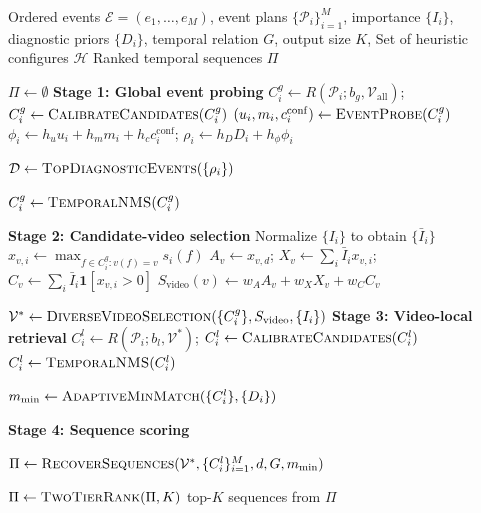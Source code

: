 \documentclass[runningheads]{llncs}
\begin{document}
\begin{algorithm}[t]
\caption{Diagnostic Event Video-first Search (DEV)}
\label{alg:dev}
\begin{algorithmic}[1]
\Require Ordered events $\mathcal{E}=(e_1,\ldots,e_M)$,
         event plans $\{\mathcal{P}_i\}_{i=1}^{M}$,
         importance $\{I_i\}$,
         diagnostic priors $\{D_i\}$,
         temporal relation $G$, output size $K$,
         Set of heuristic configures $\mathcal{H}$
\Ensure Ranked temporal sequences $\Pi$

\State $\Pi\gets\emptyset$
\State \textbf{Stage 1: Global event probing}
    \State $C_i^{g}\gets R(\mathcal{P}_i;b_g,\mathcal{V}_{\mathrm{all}})$; $C_i^{g}\gets\Call{CalibrateCandidates}{C_i^{g}}$
    \State $(u_i,m_i,c_i^{\mathrm{conf}})
           \gets\Call{EventProbe}{C_i^{g}}$
    \State $\phi_i\gets h_u u_i + h_m m_i + h_c c_i^{\mathrm{conf}}$; $\rho_i\gets h_DD_i+h_{\phi}\phi_i$
\EndFor

\State $\mathcal{D}\gets\Call{TopDiagnosticEvents}{\{\rho_i\}}$

    \State $C_i^{g}\gets\Call{TemporalNMS}{C_i^{g}}$
\EndFor

\Statex
\State \textbf{Stage 2: Candidate-video selection}
\State Normalize $\{I_i\}$ to obtain $\{\bar I_i\}$
        \State $x_{v,i}\gets
        \max_{f\in C_i^{g}:v(f)=v}s_i(f)$
    \EndFor
    \State $A_v\gets x_{v,d}$; $X_v\gets\sum_i\bar I_i x_{v,i}$; $C_v\gets\sum_i\bar I_i\mathbf{1}[x_{v,i}>0]$
    \State $S_{\mathrm{video}}(v)
           \gets w_A A_v + w_X X_v + w_C C_v$
\EndFor

\State $\mathcal{V}^{*}
       \gets\Call{DiverseVideoSelection}
       {\{C_i^{g}\},S_{\mathrm{video}},\{I_i\}}$
\Statex
\State \textbf{Stage 3: Video-local retrieval}
    \State $C_i^{l}\gets R(\mathcal{P}_i;b_l,\mathcal{V}^{*})$; $C_i^{l}\gets\Call{CalibrateCandidates}{C_i^{l}}$
    \State $C_i^{l}\gets\Call{TemporalNMS}{C_i^{l}}$
\EndFor

\State $m_{\min}\gets\Call{AdaptiveMinMatch}
      {\{C_i^{l}\},\{D_i\}}$

\Statex
\State \textbf{Stage 4: Sequence scoring}

\State $\Pi \gets
\Call{RecoverSequences}
{\mathcal{V}^{*}, \{C_i^{l}\}_{i=1}^{M}, d, G, m_{\min}}$

\State $\Pi \gets \Call{TwoTierRank}{\Pi,K}$
\State \Return top-$K$ sequences from $\Pi$

\end{algorithmic}
\end{algorithm}
\end{document}
